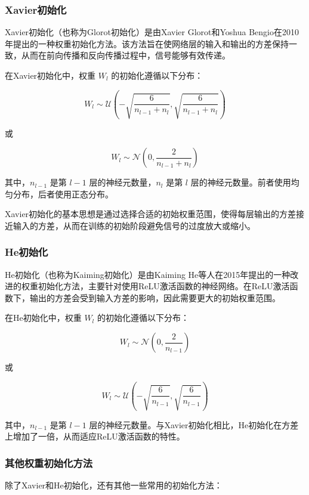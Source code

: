 \documentclass[12pt,a4paper]{amsart}
\begin{document}
\subsubsection{Xavier初始化}

Xavier初始化（也称为Glorot初始化）是由Xavier Glorot和Yoshua Bengio在2010年提出的一种权重初始化方法。该方法旨在使网络层的输入和输出的方差保持一致，从而在前向传播和反向传播过程中，信号能够有效传递。

在Xavier初始化中，权重 \( W_l \) 的初始化遵循以下分布：

\[ W_l \sim \mathcal{U}\left(-\sqrt{\frac{6}{n_{l-1} + n_l}}, \sqrt{\frac{6}{n_{l-1} + n_l}}\right) \]

或

\[ W_l \sim \mathcal{N}\left(0, \frac{2}{n_{l-1} + n_l}\right) \]

其中，\( n_{l-1} \) 是第 \( l-1 \) 层的神经元数量，\( n_l \) 是第 \( l \) 层的神经元数量。前者使用均匀分布，后者使用正态分布。

Xavier初始化的基本思想是通过选择合适的初始权重范围，使得每层输出的方差接近输入的方差，从而在训练的初始阶段避免信号的过度放大或缩小。

\subsubsection{He初始化}

He初始化（也称为Kaiming初始化）是由Kaiming He等人在2015年提出的一种改进的权重初始化方法，主要针对使用ReLU激活函数的神经网络。在ReLU激活函数下，输出的方差会受到输入方差的影响，因此需要更大的初始权重范围。

在He初始化中，权重 \( W_l \) 的初始化遵循以下分布：

\[ W_l \sim \mathcal{N}\left(0, \frac{2}{n_{l-1}}\right) \]

或

\[ W_l \sim \mathcal{U}\left(-\sqrt{\frac{6}{n_{l-1}}}, \sqrt{\frac{6}{n_{l-1}}}\right) \]

其中，\( n_{l-1} \) 是第 \( l-1 \) 层的神经元数量。与Xavier初始化相比，He初始化在方差上增加了一倍，从而适应ReLU激活函数的特性。

\subsubsection{其他权重初始化方法}

除了Xavier和He初始化，还有其他一些常用的初始化方法：
\end{document}

